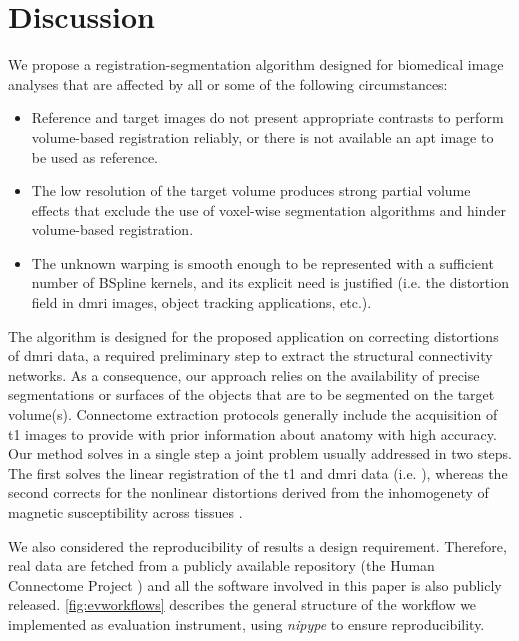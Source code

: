 \section*{Discussion}
\label{sec:discussion}
We propose a registration-segmentation algorithm designed for biomedical
  image analyses that are affected by all or some of the following circumstances:
  \begin{itemize}
  	\item Reference and target images do not present appropriate contrasts to
  	perform volume-based registration reliably, or there is not available an apt image
 		to be used as reference.
  	\item The low resolution of the target volume produces strong partial volume effects
  	that exclude the use of voxel-wise segmentation algorithms and hinder volume-based
  	registration.
  	\item The unknown warping is smooth enough to be represented with a sufficient number
  	of BSpline kernels, and its explicit need is justified (i.e. the distortion
  	field in \gls*{dmri} images, object tracking applications, etc.).
  \end{itemize}
The algorithm is designed for the proposed application on correcting distortions of
  \gls*{dmri} data, a required preliminary step to extract the structural connectivity
  networks.
As a consequence, our approach relies on the availability of precise segmentations or
  surfaces of the objects that are to be segmented on the target volume(s).
Connectome extraction protocols generally include the acquisition of \gls*{t1} images
  to provide with prior information about anatomy with high accuracy.
Our method solves in a single step a joint problem usually addressed in two steps.
The first solves the linear registration of the \gls*{t1} and \gls*{dmri} data (i.e.
  \cite{greve_accurate_2009}), whereas the second corrects for the nonlinear distortions
  derived from the inhomogenety of magnetic susceptibility across tissues
  \citep{jezzard_correction_1995}.

{\color{red} We also considered the reproducibility of results a design requirement.
Therefore, real data are fetched from a publicly available repository
  (the Human Connectome Project \citep{essen_human_2012}) and all the software
  involved in this paper is also publicly released.
\autoref{fig:evworkflows} describes the general structure of the workflow we implemented
  as evaluation instrument, using \emph{nipype} \citep{gorgolewski_nipype_2011} to ensure
  reproducibility.}

